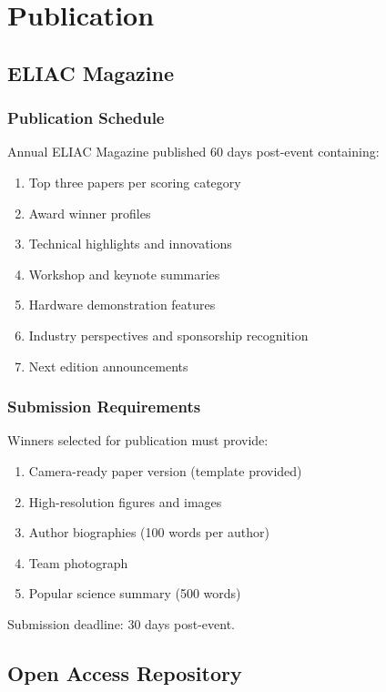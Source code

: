 
\renewcommand{\thesection}{PU}
\section{Publication}

\subsection{ELIAC Magazine}

\subsubsection{Publication Schedule}
Annual ELIAC Magazine published 60 days post-event containing:
\begin{enumerate}[noitemsep]
    \item Top three papers per scoring category
    \item Award winner profiles
    \item Technical highlights and innovations
    \item Workshop and keynote summaries
    \item Hardware demonstration features
    \item Industry perspectives and sponsorship recognition
    \item Next edition announcements
\end{enumerate}

\subsubsection{Submission Requirements}
Winners selected for publication must provide:
\begin{enumerate}[noitemsep]
    \item Camera-ready paper version (template provided)
    \item High-resolution figures and images
    \item Author biographies (100 words per author)
    \item Team photograph
    \item Popular science summary (500 words)
\end{enumerate}

Submission deadline: 30 days post-event.

\subsection{Open Access Repository}

